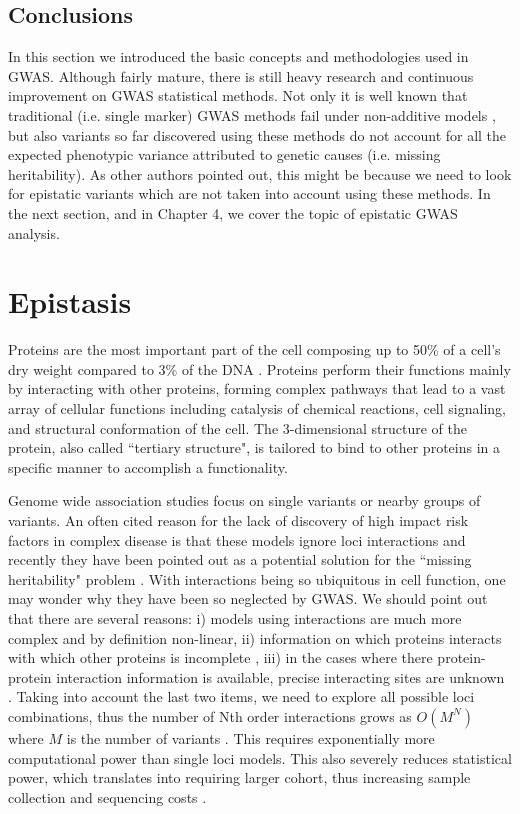 \subsection{Conclusions}

In this section we introduced the basic concepts and methodologies used in GWAS. Although fairly mature, there is still heavy research and continuous improvement on GWAS statistical methods. Not only it is well known that traditional (i.e. single marker) GWAS methods fail under non-additive models \cite{culverhouse2002perspective}, but also variants so far discovered using these methods do not account for all the expected phenotypic variance attributed to genetic causes (i.e. missing heritability). As other authors pointed out, this might be because we need to look for epistatic variants which are not taken into account using these methods. In the next section, and in Chapter 4, we cover the topic of epistatic GWAS analysis.

\section{Epistasis}

Proteins are the most important part of the cell composing up to 50\% of a cell’s dry weight compared to 3\% of the DNA \cite{alberts1995molecular}. Proteins perform their functions mainly by interacting with other proteins, forming complex pathways that lead to a vast array of cellular functions including catalysis of chemical reactions, cell signaling, and structural conformation of the cell. The 3-dimensional structure of the protein, also called ``tertiary structure", is tailored to bind to other proteins in a specific manner to accomplish a functionality. 

Genome wide association studies focus on single variants or nearby groups of variants. An often cited reason for the lack of discovery of high impact risk factors in complex disease is that these models ignore loci interactions \cite{cordell2009detecting} and recently they have been pointed out as a potential solution for the ``missing heritability" problem \cite{zuk2012mystery, zuk2014searching}. With interactions being so ubiquitous in cell function, one may wonder why they have been so neglected by GWAS. We should point out that there are several reasons: i) models using interactions are much more complex \cite{gao2010classification} and by definition non-linear, ii) information on which proteins interacts with which other proteins is incomplete \cite{venkatesan2009empirical}, iii) in the cases where there protein-protein interaction information is available, precise interacting sites are unknown \cite{venkatesan2009empirical}. Taking into account the last two items, we need to explore all possible loci combinations, thus the number of Nth order interactions grows as $O(M^N)$ where $M$ is the number of variants \cite{de2013emerging}. This requires exponentially more computational power than single loci models. This also severely reduces statistical power, which translates into requiring larger cohort, thus increasing sample collection and sequencing costs \cite{de2013emerging}.

